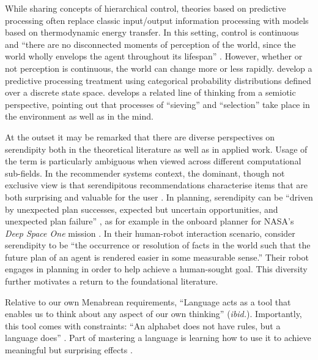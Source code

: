 While sharing concepts of hierarchical control, theories based on
predictive processing often replace classic input/output information
processing with models based on thermodynamic energy transfer.  In
this setting, control is continuous and ``there are no disconnected
moments of perception of the world, since the world wholly envelops
the agent throughout its lifespan''
\cite[pp.~9--10]{10.3389/frobt.2018.00021}.  However, whether or not
perception is continuous, the world can change more or less rapidly.
\citet{KWISTHOUT201784} develop a predictive processing treatment
using categorical probability distributions defined over a discrete
state space.  \citet{kockelman2011biosemiosis} develops a related line
of thinking from a semiotic perspective, pointing out that processes
of ``sieving'' and ``selection'' take place in the environment as well
as in the mind.


At the outset it may be remarked that there are diverse perspectives on serendipity both in the theoretical literature as well as in applied work.  Usage of the term is particularly ambiguous when viewed across different computational sub-fields.  In the recommender systems context, the dominant, though not exclusive view is that serendipitous recommendations characterise items that are both surprising and valuable for the user \cite{Lu2012,Herlocker2004}.  In planning, serendipity can be ``driven by unexpected plan successes, expected but uncertain opportunities, and unexpected plan failure'' \cite{NelsonSerendipitySymp17}, as for example in the onboard planner for NASA's \emph{Deep Space One} mission \cite{muscettola1997board}. In their human-robot interaction scenario, \citet{chakraborti2015planning} consider serendipity to be ``the occurrence or resolution of facts in the world such that the future plan of an agent is rendered easier in some measurable sense.''  Their robot engages in planning in order to help achieve a human-sought goal.
This diversity further motivates a return to the foundational literature.

 Relative to our own Menabrean requirements, ``Language acts as a tool that enables us to think about any aspect of our own thinking'' (\emph{ibid.}).  Importantly, this tool comes with constraints: ``An alphabet does not have rules, but a language does'' \cite[p.~ix]{eco2014introduction}.   Part of mastering a language is learning how to use it to achieve meaningful but surprising effects \cite{hoey2012lexical}.

